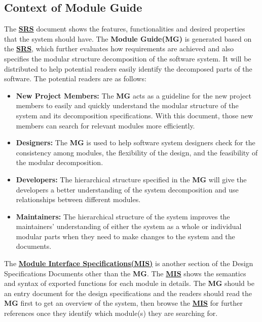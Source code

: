 \documentclass[12pt, titlepage]{article}
\begin{document}
\subsection{Context of Module Guide}
The \href{https://gitlab.cas.mcmaster.ca/wangs132/minecraft/-/blob/master/Doc/SRS/SRS.pdf}{\textbf{SRS}} document shows the features, functionalities and desired properties that the system should have.
The \textbf{Module Guide(MG)} is generated based on the \href{https://gitlab.cas.mcmaster.ca/wangs132/minecraft/-/blob/master/Doc/SRS/SRS.pdf}{\textbf{SRS}}, which further evaluates how requirements are achieved and also specifies the modular structure decomposition of the software system. It will be distributed to help potential readers easily identify the decomposed parts of the software. The potential readers are as follows:
\begin{itemize}

    \item \textbf{New Project Members:} The \textbf{MG} acts as a guideline for the new project members to easily and quickly understand the modular structure of the system and its decomposition specifications. With this document, those new members can search for relevant modules more efficiently.
    \item \textbf{Designers:} The \textbf{MG} is used to help software system designers check for the consistency among modules, the flexibility of the design, and the feasibility of the modular decomposition.
    \item \textbf{Developers:} The hierarchical structure specified in the \textbf{MG} will give the developers a better understanding of the system decomposition and use relationships between different modules.
    \item \textbf{Maintainers:} The hierarchical structure of the system improves the maintainers' understanding of either the system as a whole or individual modular parts when they need to make changes to the system and the documents.
\end{itemize}
The \href{https://gitlab.cas.mcmaster.ca/wangs132/minecraft/-/blob/master/Doc/Design/MIS/MIS.pdf}{\textbf{Module Interface Specifications(MIS)}} is another section of the Design Specifications Documents other than the \textbf{MG}. The \href{https://gitlab.cas.mcmaster.ca/wangs132/minecraft/-/blob/master/Doc/Design/MIS/MIS.pdf}{\textbf{MIS}} shows the semantics and syntax of exported functions for each module in details. The \textbf{MG} should be an entry document for the design specifications and the readers should read the \textbf{MG} first to get an overview of the system, then browse the \href{https://gitlab.cas.mcmaster.ca/wangs132/minecraft/-/blob/master/Doc/Design/MIS/MIS.pdf}{\textbf{MIS}} for further references once they identify which module(s) they are searching for.
\end{document}
